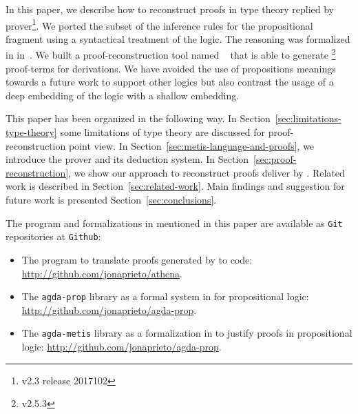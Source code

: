 \documentclass[../main.tex]{subfiles}
\begin{document}
In this paper, we describe how to reconstruct proofs in type theory
replied by \Metis prover\footnote{v2.3 release 2017102}.
We ported the subset of the \Metis inference rules for the propositional 
fragment using a syntactical treatment of the logic. The \Metis reasoning was formalized in \Agda in~\cite{AgdaProp,AgdaMetis}. We built a proof-reconstruction tool named \Athena~\cite{Athena} that is able to generate \Agda\footnote{v2.5.3} proof-terms for \Metis derivations. We have avoided the use of propositions meanings towards a future work to support other logics
but also contrast the usage of a deep embedding of the logic with
a shallow embedding.

This paper has been organized in the following way.
In Section~\ref{sec:limitations-type-theory} some limitations of type theory
are discussed for proof-reconstruction point view.
In Section~\ref{sec:metis-language-and-proofs}, we introduce the
\Metis prover and its deduction system.
In Section~\ref{sec:proof-reconstruction}, we show our
approach to reconstruct proofs deliver by \Metis.
Related work is described in Section~\ref{sec:related-work}.
Main findings and suggestion for future work is presented Section~\ref{sec:conclusions}.


The program and formalizations in \Agda mentioned in this paper are available
as \verb!Git! repositories at \verb!Github!:

\begin{itemize}
  \item The \Athena program to translate proofs generated by \Metis to \Agda code:
  \url{http://github.com/jonaprieto/athena}.
  \item The \verb!agda-prop! library as a formal system in \Agda for propositional logic:
  \url{http://github.com/jonaprieto/agda-prop}.
  \item The \verb!agda-metis! library as a formalization in \Agda to justify \Metis proofs in propositional
  logic:
  \url{http://github.com/jonaprieto/agda-prop}.
\end{itemize}
\end{document}

